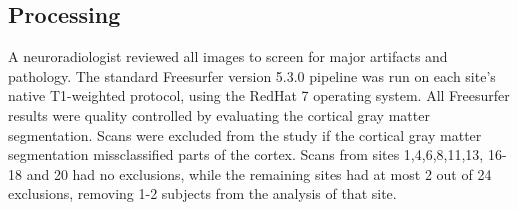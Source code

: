 \subsection{Processing}
 A neuroradiologist reviewed all images to screen for major artifacts and pathology. The standard Freesurfer\cite{freesurferPaper} version 5.3.0 pipeline was run on each site's native T1-weighted protocol, using the RedHat 7 operating system. All Freesurfer results were quality controlled by evaluating the cortical gray matter segmentation. Scans were excluded from the study if the cortical gray matter segmentation missclassified parts of the cortex. Scans from sites 1,4,6,8,11,13, 16-18 and 20 had no exclusions, while the remaining sites had at most 2 out of 24 exclusions, removing 1-2 subjects from the analysis of that site.  